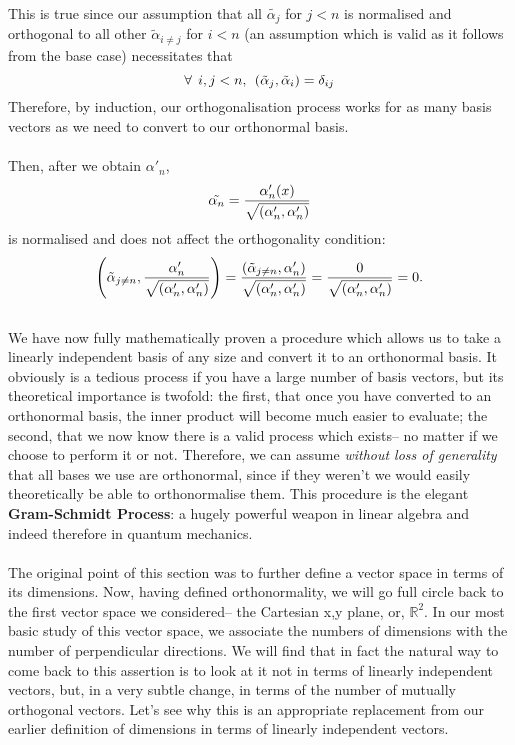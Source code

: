 This is true since our assumption that all $\tilde{\alpha_j}$ for $j<n$ is normalised and orthogonal to all other $\tilde{\alpha}_{i\neq j}$ for $i<n$ (an assumption which is valid as it follows from the base case) necessitates that 
$$
\forall\:\: i,j < n, \:\: \left(\tilde{\alpha}_{j},\tilde{\alpha}_{i}\right)= \delta_{ij}
$$
Therefore, by induction, our orthogonalisation process works for as many basis vectors as we need to convert to our orthonormal basis.
\\\\
Then, after we obtain $\alpha'_{n}$,
$$
\tilde{\alpha_{n}}=\frac{\alpha'_{n}(x)}{\sqrt{\left(\alpha'_{n},\alpha'_{n}\right)}}
$$
is normalised and does not affect the orthogonality condition:
$$
\left(\tilde{\alpha}_{j\neq n}, \frac{\alpha'_{n}}{\sqrt{\left(\alpha'_{n},\alpha'_{n}\right)}}\right)=\frac{\left(\tilde{\alpha}_{j\neq n},\alpha'_{n}\right)}{\sqrt{\left(\alpha'_{n},\alpha'_{n}\right)}}= \frac{0}{\sqrt{\left(\alpha'_{n},\alpha'_{n}\right)}}=0.
$$
\\
We have now fully mathematically proven a procedure which allows us to take a linearly independent basis of any size and convert it to an orthonormal basis. It obviously is a tedious process if you have a large number of basis vectors, but its theoretical importance is twofold: the first, that once you have converted to an orthonormal basis, the inner product will become much easier to evaluate; the second, that we now know there is a valid process which exists-- no matter if we choose to perform it or not. Therefore, we can assume \textit{without loss of generality} that all bases we use are orthonormal, since if they weren't we would easily theoretically be able to orthonormalise them. This procedure is the elegant \textbf{Gram-Schmidt Process}: a hugely powerful weapon in linear algebra and indeed therefore in quantum mechanics.
\\\\
The original point of this section was to further define a vector space in terms of its dimensions. Now, having defined orthonormality, we will go full circle back to the first vector space we considered-- the Cartesian x,y plane, or, $\mathbb{R}^2$. In our most basic study of this vector space, we associate the numbers of dimensions with the number of perpendicular directions. We will find that in fact the natural way to come back to this assertion is to look at it not in terms of linearly independent vectors, but, in a very subtle change, in terms of the number of mutually orthogonal vectors. Let's see why this is an appropriate replacement from our earlier definition of dimensions in terms of linearly independent vectors.
